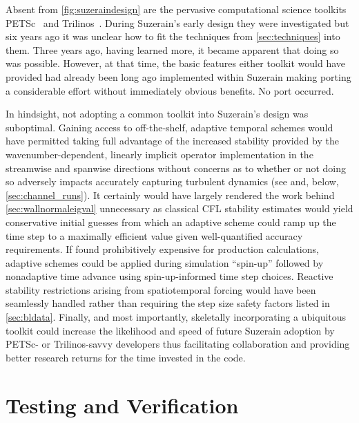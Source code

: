 Absent from \autoref{fig:suzeraindesign} are the pervasive
computational science toolkits PETSc~\citep{Balay1997Efficient} and
Trilinos~\citep{Heroux2005Overview}.  During Suzerain's early design they were
investigated but six years ago it was unclear how to fit the techniques
from \autoref{sec:techniques} into them.  Three years ago, having learned more,
it became apparent that doing so was possible.  However, at that time, the
basic features either toolkit would have provided had already been long ago
implemented within Suzerain making porting a considerable effort
without immediately obvious benefits.  No port occurred.

In hindsight, not adopting a common toolkit into Suzerain's design was
suboptimal.  Gaining access to off-the-shelf, adaptive temporal schemes
would have permitted taking full advantage of the increased stability provided
by the wavenumber-dependent, linearly implicit operator implementation in the
streamwise and spanwise directions without concerns as to whether or not doing
so adversely impacts accurately capturing turbulent dynamics (see
 and, below, \autoref{sec:channel_runs}).  It
certainly would have largely rendered the work behind
\autoref{sec:wallnormaleigval} unnecessary as classical CFL stability estimates
would yield conservative initial guesses from which an adaptive scheme could
ramp up the time step to a maximally efficient value given well-quantified
accuracy requirements.  If found prohibitively expensive for production calculations,
adaptive schemes could be applied during simulation ``spin-up'' followed by
nonadaptive time advance using spin-up-informed time step choices.  Reactive
stability restrictions arising from spatiotemporal forcing would have been
seamlessly handled rather than requiring the step size safety factors listed
in \autoref{sec:bldata}.  Finally, and most importantly, skeletally
incorporating a ubiquitous toolkit could increase the likelihood and speed of
future Suzerain adoption by PETSc- or Trilinos-savvy developers thus
facilitating collaboration and providing better research returns for the time
invested in the code.


\section{Testing and Verification}


